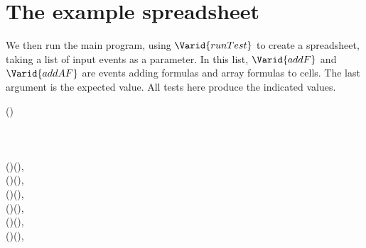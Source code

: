 \section{The example spreadsheet}

We then run the main program, using \ensuremath{\Varid{runTest}} to create a spreadsheet, taking
a list of input events as a parameter. In this list, \ensuremath{\Varid{addF}} and \ensuremath{\Varid{addAF}} are
events adding formulas and array formulas to cells. The last argument is the
expected value. All tests here produce the indicated values.

\begin{hscode}\SaveRestoreHook
{}%
%
%
%
\>[B]{}\mathbin{::}\;(){}\<[E]%
\\
\>[B]{}\mathrel{=}{}\<[E]%
\\
\>[B]{}\<[4]%
\>[4]{}\<[E]%
\\
\>[B]{}\<[4]%
\>[4]{}\;\;[\mskip1.5mu {}\<[E]%
\\
\>[4]{}\<[7]%
\>[7]{}\;\;(\;)\;(\;),{}\<[E]%
\\
\>[4]{}\<[7]%
\>[7]{}\;\;(\;)\;(\;),{}\<[E]%
\\
\>[4]{}\<[7]%
\>[7]{}\;\;(\;)\;(\;),{}\<[E]%
\\
\>[4]{}\<[7]%
\>[7]{}\;\;(\;)\;(\;),{}\<[E]%
\\
\>[4]{}\<[7]%
\>[7]{}\;\;(\;)\;(\;),{}\<[E]%
\\
\>[4]{}\<[7]%
\>[7]{}\;\;(\;)\;(\;),{}\<[E]%
\\
\>[4]{}\<[7]%

\end{hscode}
